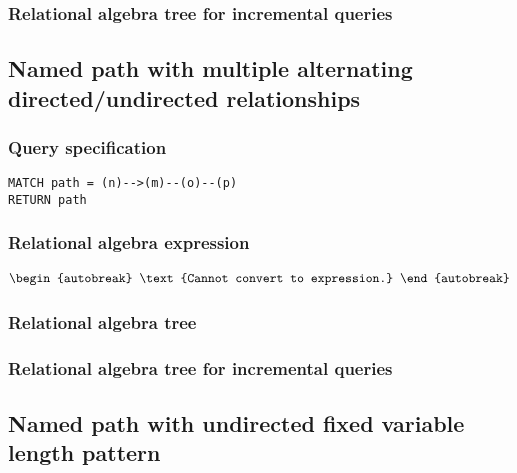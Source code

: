 \subsubsection*{Relational algebra tree for incremental queries}


\subsection{Named path with multiple alternating directed/undirected relationships}

\subsubsection*{Query specification}

\begin{lstlisting}
MATCH path = (n)-->(m)--(o)--(p)
RETURN path
\end{lstlisting}

\subsubsection*{Relational algebra expression}

\begin{align*}
\begin{autobreak}
\text{Cannot convert to expression.}
\end{autobreak}
\end{align*}

\subsubsection*{Relational algebra tree}


\subsubsection*{Relational algebra tree for incremental queries}


\subsection{Named path with undirected fixed variable length pattern}

